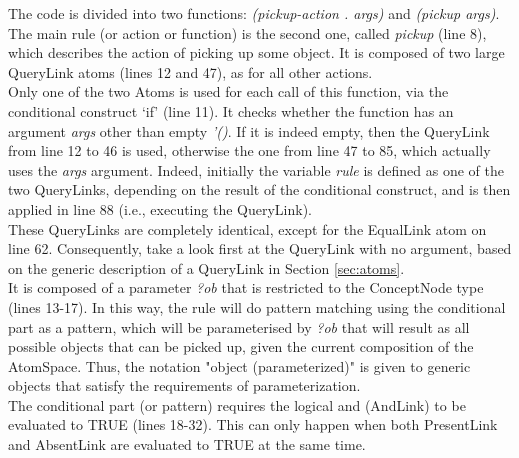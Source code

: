 The code is divided into two functions: \textit{(pickup-action . args)} and \textit{(pickup args)}. \\
The main rule (or action or function) is the second one, called \textit{pickup} (line 8), which describes the action of picking up some object.
It is composed of two large QueryLink atoms (lines 12 and 47), as for all other actions. \\
Only one of the two Atoms is used for each call of this function, via the conditional construct `if' (line 11). It checks whether the function has an argument \textit{args} other than empty \textit{'()}. 
If it is indeed empty, then the QueryLink from line 12 to 46 is used, otherwise the one from line 47 to 85, which actually uses the \textit{args} argument.
Indeed, initially the variable \textit{rule} is defined as one of the two QueryLinks, depending on the result of the conditional construct, and is then applied in line 88 (i.e., executing the QueryLink). \\
These QueryLinks are completely identical, except for the EqualLink atom on line 62.
Consequently, take a look first at the QueryLink with no argument, based on the generic description of a QueryLink in Section \ref{sec:atoms}.\\
It is composed of a parameter \textit{?ob} that is restricted to the ConceptNode type (lines 13-17). 
In this way, the rule will do pattern matching using the conditional part as a pattern, which will be parameterised by \textit{?ob} that will result as all possible objects that can be picked up, given the current composition of the AtomSpace. Thus, the notation "object (parameterized)" is given to generic objects that satisfy the requirements of parameterization. \\
The conditional part (or pattern) requires the logical and (AndLink) to be evaluated to TRUE (lines 18-32). This can only happen when both PresentLink and AbsentLink are evaluated to TRUE at the same time. 

